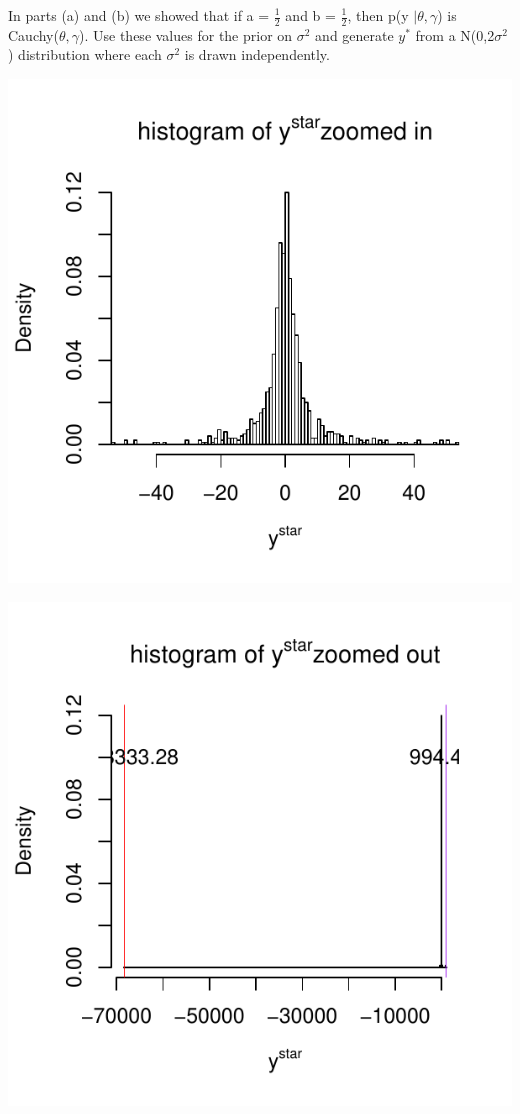 \documentclass{article}\usepackage[]{graphicx}\usepackage[]{color}
\makeatletter
\def\maxwidth{ %
  \ifdim\Gin@nat@width>\linewidth
    \linewidth
  \else
    \Gin@nat@width
  \fi
}
\newenvironment{knitrout}{}{} %
\makeatother
\begin{document}
\begin{enumerate}
\begin{enumerate}
In parts (a) and (b) we showed that if a = $\frac{1}{2}$ and b = $\frac{1}{2}$, then p(y $| \theta, \gamma$) is Cauchy($\theta, \gamma$). Use these values for the prior on $\sigma^2$ and generate $y^{*}$ from a N(0,2$\sigma^2$) distribution where each $\sigma^2$ is drawn independently.

\begin{knitrout}
\color{fgcolor}

{\centering \includegraphics[width=\maxwidth]{figure/prob5c-1} 

}




{\centering \includegraphics[width=\maxwidth]{figure/prob5c-2} 

}
\end{knitrout}
\end{enumerate}
\end{enumerate}
\end{document}
